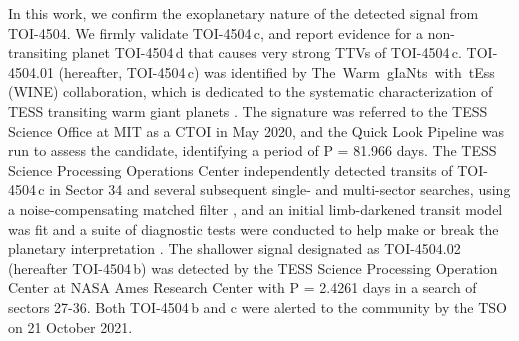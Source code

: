 \documentclass[twocolumn,twocolappendix]{aastex631}
\begin{document}
In this work, we confirm the exoplanetary nature of the detected signal from TOI-4504. We firmly validate TOI-4504\,c, and report evidence for a non-transiting planet TOI-4504\,d that causes very strong TTVs of TOI-4504\,c. TOI-4504.01 (hereafter, TOI-4504\,c) was identified by The~Warm~gIaNts~with~tEss (WINE) collaboration, which is dedicated to the systematic characterization of TESS transiting warm giant planets \citep[see e.g.,][and references therein]{wine1,wine2,wine3,wine4,wine5,Bozhilov2023,TOI-199,jones2024}. The signature was referred to the TESS Science Office at MIT as a CTOI in May 2020, and the Quick Look Pipeline \citep[QLP,][]{QLPa,QLPb} was run to assess the candidate, identifying a period of P = 81.966 days. The TESS Science Processing Operations Center \citep[SPOC,][]{SPOC} independently detected transits of TOI-4504\,c in Sector 34 and several subsequent single- and multi-sector searches, using a noise-compensating matched filter \citep{Jenkins2002,Jenkins2020}, and an initial limb-darkened transit model was fit \citep{Li2019} and a suite of diagnostic tests were conducted to help make or break the planetary interpretation \citep{Twicken2018}. The shallower signal designated as TOI-4504.02 (hereafter TOI-4504\,b) was detected by the TESS Science Processing Operation Center \citep[SPOC,][]{SPOC} at NASA Ames Research Center with P = 2.4261 days in a search of sectors 27-36. Both TOI-4504\,b and c were alerted to the community by the TSO on 21 October 2021.

\end{document}
